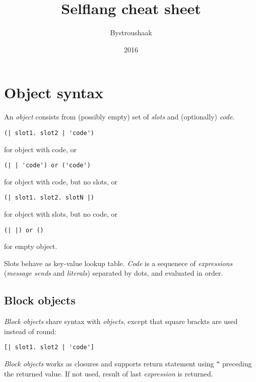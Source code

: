 \documentclass[10pt]{article}
\title{Selflang cheat sheet}
\author{Bystroushaak}
\date{2016}
\renewcommand{\maketitle}{
    {\begin{center}\Large \mythetitle\end{center}}
}
\begin{document}
\begin{multicols*}{3}
\maketitle

\section{Object syntax}
An \textit{object} consists from (possibly empty) set of \textit{slots} and (optionally) \textit{code}.

\begin{lstlisting}
(| slot1. slot2 | 'code')
\end{lstlisting}

for object with code, or

\begin{lstlisting}
(| | 'code') or ('code')
\end{lstlisting}

for object with code, but no slots, or

\begin{lstlisting}
(| slot1. slot2. slotN |)
\end{lstlisting}

for object with slots, but no code, or

\begin{lstlisting}
(| |) or ()
\end{lstlisting}

for empty object.
\vspace*{0.2cm}

Slots behave as key-value lookup table. \textit{Code} is a sequenece of \textit{expressions} (\textit{message sends} and \textit{literals}) separated by dots, and evaluated in order.

\subsection{Block objects}
\textit{Block objects} share syntax with \textit{objects}, except that square brackts are used instead of round:

\begin{lstlisting}
[| slot1. slot2 | 'code']
\end{lstlisting}

\textit{Block objects} works as closures and supports return statement using \texttt{\^} preceding the returned value. If not used, result of last \textit{expression} is returned.


\end{multicols*}
\end{document}
